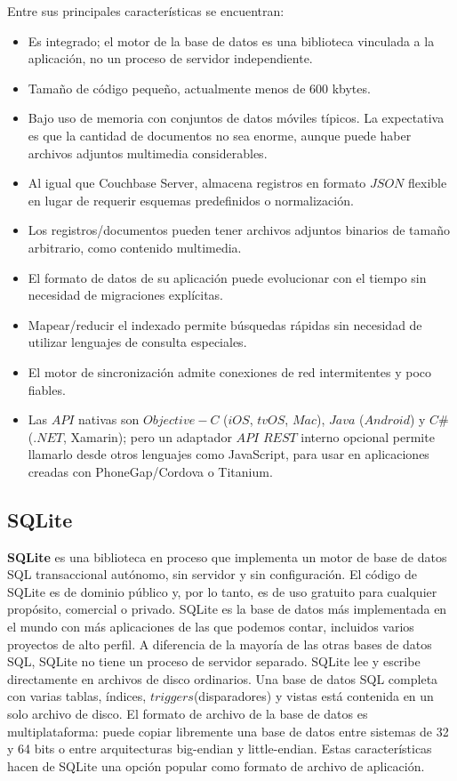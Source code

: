 Entre sus principales características se encuentran: 
\begin{itemize}


\item	Es integrado; el motor de la base de datos es una biblioteca vinculada a la aplicación, no un proceso de servidor independiente.
\item	Tamaño de código pequeño, actualmente menos de $600$ kbytes. 
\item	Bajo uso de memoria con conjuntos de datos móviles típicos. La expectativa es que la cantidad de documentos no sea enorme, aunque puede haber archivos adjuntos multimedia considerables.
\item	Al igual que Couchbase Server, almacena registros en formato $JSON$ flexible en lugar de requerir esquemas predefinidos o normalización.
\item	Los registros/documentos pueden tener archivos adjuntos binarios de tamaño arbitrario, como contenido multimedia.
\item	El formato de datos de su aplicación puede evolucionar con el tiempo sin necesidad de migraciones explícitas.
\item	Mapear/reducir el indexado permite búsquedas rápidas sin necesidad de utilizar lenguajes de consulta especiales.
\item	El motor de sincronización admite conexiones de red intermitentes y poco fiables.
\item	Las $API$ nativas son $Objective-C$ ($iOS$, $tvOS$, $Mac$), $Java$ ($Android$) y $C\#$ ($.NET$, Xamarin); pero un adaptador $API$ $REST$ interno opcional permite llamarlo desde otros lenguajes como JavaScript, para usar en aplicaciones creadas con PhoneGap/Cordova o Titanium.

\end{itemize}

\subsection{SQLite}\label{chapter:introduction}




\textbf{SQLite}  es una biblioteca en proceso que implementa un motor de base de datos SQL transaccional autónomo, sin servidor y sin configuración. El código de SQLite es de dominio público y, por lo tanto, es de uso gratuito para cualquier propósito, comercial o privado. SQLite es la base de datos más implementada en el mundo con más aplicaciones de las que podemos contar, incluidos varios proyectos de alto perfil. A diferencia de la mayoría de las otras bases de datos SQL, SQLite no tiene un proceso de servidor separado. SQLite lee y escribe directamente en archivos de disco ordinarios. Una base de datos SQL completa con varias tablas, índices, $triggers $(disparadores) y vistas está contenida en un solo archivo de disco. El formato de archivo de la base de datos es multiplataforma: puede copiar libremente una base de datos entre sistemas de 32 y 64 bits o entre arquitecturas big-endian y little-endian. Estas características hacen de SQLite una opción popular como formato de archivo de aplicación. 

